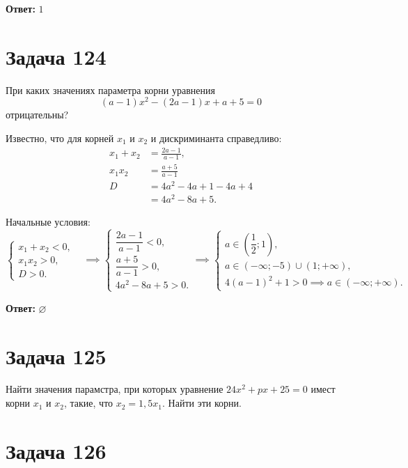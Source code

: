 \documentclass[a4paper,12pt]{article}
\begin{document}
\bigskip

\textbf{Ответ:} \(1\)

\section{Задача 124}

При каких значениях параметра корни уравнения
\[
(a - 1)x^2 - (2a - 1)x + a + 5 = 0
\]
отрицательны?

Известно, что для корней $x_1$ и $x_2$ и дискриминанта справедливо:
\begin{align*}
    x_1 + x_2 &= \frac{2a - 1}{a - 1}, \\
    x_1 x_2 &= \frac{a + 5}{a - 1} \\
    D &= 4a^2 - 4a + 1 - 4a + 4 \\
      &= 4a^2 - 8a + 5.
\end{align*}

Начальные условия:
\[
\begin{cases}
    x_1 + x_2 < 0, & \\
    x_1 x_2 > 0,   & \\
    D > 0.         &
\end{cases}
\implies
\begin{cases}
    \dfrac{2a - 1}{a - 1} < 0, \\[6pt]
    \dfrac{a + 5}{a - 1} > 0, \\[6pt]
    4a^2 - 8a + 5 > 0.
\end{cases}
\implies
\begin{cases}
    a \in (\dfrac{1}{2}; 1), \\
    a \in (-\infty; -5) \cup (1; +\infty), \\
    4(a - 1)^2 + 1 > 0 \implies a \in (-\infty; +\infty).
\end{cases}
\]

\bigskip

\textbf{Ответ:} $\varnothing$

\section{Задача 125}

Найти значения парамстра, при которых уравнение
$24x^2 + px + 25 = 0$ имест корни $x_1$ и $x_2$, такие, что $x_2 = 1,5x_1$.
Найти эти корни.

\section{Задача 126}
\end{document}
